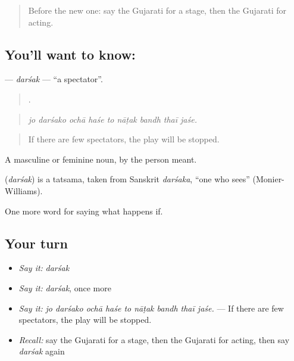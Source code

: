 \label{lesson:GU-C552-darsak}



\begin{quote}
Before the new one: say the Gujarati for a stage, then the Gujarati for acting.
\end{quote}

\subsection*{You'll want to know: }
\textbf{} — \emph{darśak} — \textquotedblleft{}a spectator\textquotedblright{}.

\begin{quote}
        .
\end{quote}

\begin{quote}
\emph{jo darśako ochā haśe to nāṭak bandh thaī jaśe.}
\end{quote}

\begin{quote}
If there are few spectators, the play will be stopped.
\end{quote}

A masculine or feminine noun, by the person meant.

\begin{cousinweb}
\textbf{} (\emph{darśak}) is a tatsama, taken from Sanskrit \emph{darśaka}, \textquotedblleft{}one who sees\textquotedblright{} (Monier-Williams).
\end{cousinweb}

\begin{grammarlens}[title={What you've built}]
One more word for saying what happens if.
\end{grammarlens}

\subsection*{Your turn}
\begin{itemize}
\raggedright
  \item \emph{Say it:} \emph{darśak}
  \item \emph{Say it:} \emph{darśak}, once more
  \item \emph{Say it:} \emph{jo darśako ochā haśe to nāṭak bandh thaī jaśe.} — If there are few spectators, the play will be stopped.
  \item \emph{Recall:} say the Gujarati for a stage, then the Gujarati for acting, then say \emph{darśak} again
\end{itemize}

